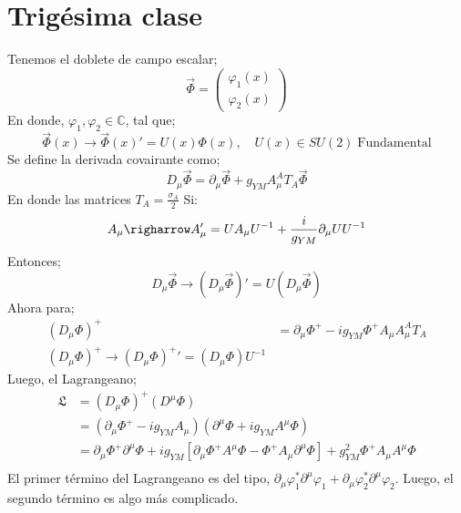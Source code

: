 \documentclass[../main.tex]{subfiles}
\begin{document}
\section{Trigésima clase}
Tenemos el doblete de campo escalar;
\begin{equation}
  \vec{\Phi} = \begin{pmatrix}
    \varphi_1(x) \\ \varphi_2(x)
  \end{pmatrix}
 \end{equation}
 En donde, $\varphi_1, \varphi_2\in \mathbb{C}$, tal que;
 \begin{equation}
   \vec{\Phi}(x) \rightarrow \vec{\Phi}(x)' = U(x)\Phi(x), \quad U(x)\in SU(2)\; \text{Fundamental}
  \end{equation}
  Se define la derivada covairante como;
  \begin{equation}
    D_\mu \vec{\Phi} = \partial_\mu \vec{\Phi} + g_{YM} A^A_\mu T_A \vec{\Phi}
   \end{equation}
  En donde las matrices $T_A=\frac{\sigma_A}{2}$
Si:
\begin{equation}
  A_\mu \righarrow A_\mu' = UA_\mu U^{-1} + \frac{i}{g_{YM}} \partial_\mu U U^{-1}
 \end{equation}
 Entonces;
 \begin{equation}
   D_\mu \vec{\Phi} \rightarrow \left( D_\mu \vec{\Phi} \right)' = U \left( D_\mu \vec{\Phi} \right)
  \end{equation}
  Ahora para;
  \begin{align*}
    \left( D_\mu \Phi \right)^+ & = \partial_\mu \Phi^+ - ig_{YM} \Phi^+ A_\mu A^A_\mu T_A \\
    \left( D_\mu \Phi \right)^+ \rightarrow \left( D_\mu \Phi \right)^+' = \left( D_\mu \Phi \right)U^{-1}
  \end{align*}
Luego, el Lagrangeano;
\begin{align*}
  \mathfrak{L} & = \left( D_\mu \Phi \right)^+ \left( D^\mu \Phi \right) \\
  & = \left( \partial_\mu \Phi^+ - ig_{YM} A_\mu \right) \left( \partial^\mu \Phi + ig_{YM} A^\mu \Phi \right) \\
  & = \partial_\mu \Phi^+ \partial^\mu \Phi + ig_{YM} \left[ \partial_\mu \Phi^+ A^\mu \Phi - \Phi^+ A_\mu \partial^\mu \Phi \right] + g^2_{YM} \Phi^+ A_\mu A^\mu \Phi \\
\end{align*}
El primer término del Lagrangeano es del tipo, $\partial_\mu \varphi_1^* \partial^\mu \varphi_1 + \partial_\mu \varphi^*_2 \partial^\mu \varphi_2$. Luego, el segundo término es algo más complicado. 
\end{document}
